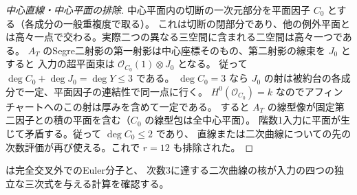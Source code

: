 \begin{proof}[中心直線・中心平面の排除]
中心平面内の切断の一次元部分を平面因子 $C_0$ とする（各成分の一般重複度で取る）。
これは切断の閉部分であり、他の例外平面とは高々一点で交わる。実際二つの異なる三空間に含まれる二空間は高々一つである。
$A_T$ のSegre二射影の第一射影は中心座標そのもの、第二射影の線束を $J_0$ とすると
入力の超平面束は $\mathcal O_{C_0}(1)\otimes J_0$ となる。
従って $\deg C_0+\deg J_0=\deg Y\le3$ である。
$\deg C_0=3$ なら $J_0$ の射は被約台の各成分で一定、平面因子の連結性で同一点に行く。
$H^0(\mathcal O_{C_0})=k$ なのでアフィンチャートへのこの射は厚みを含めて一定である。
すると $A_T$ の線型像が固定第二因子との積の平面を含む（$C_0$ の線型包は全中心平面）。
階数1入力に平面が生じて矛盾する。従って $\deg C_0\le2$ であり、
直線または二次曲線についての先の次数評価が再び使える。これで $r=12$ も排除された。
\end{proof}

 は完全交叉外でのEuler分子と、
次数3に達する二次曲線の核が入力の四つの独立な三次式を与える計算を確認する。
